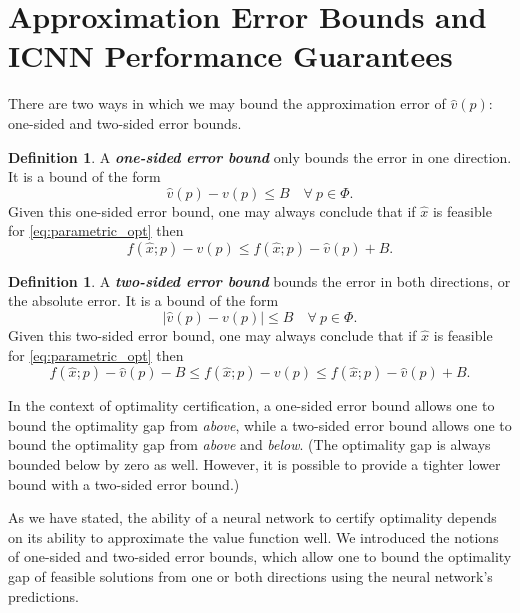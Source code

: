 \documentclass[10pt]{article} %
\theoremstyle{plain}
\theoremstyle{definition}
\newtheorem{definition}[theorem]{Definition}
\theoremstyle{remark}
\begin{document}
\section{Approximation Error Bounds and ICNN Performance Guarantees} \label{app:icnn-guarantees}

There are two ways in which we may bound the approximation error of $\hat{v}(p)$: one-sided and two-sided error bounds.

\begin{definition}
    A \textbf{\textit{one-sided error bound}} only bounds the error in one direction. It is a bound of the form
    \[
    \hat{v}(p) - v(p) \leq B \quad \forall~ p \in \Phi.
    \]
    Given this one-sided error bound, one may always conclude that if $\hat{x}$ is feasible for \eqref{eq:parametric_opt} then 
    \[
    f(\hat{x};p) - v(p) \leq f(\hat{x};p) - \hat{v}(p) + B.
    \]
\end{definition}

\begin{definition}
   A \textbf{\textit{two-sided error bound}} bounds the error in both directions, or the absolute error. It is a bound of the form
   \[
   |\hat{v}(p) - v(p)| \leq B \quad \forall~ p \in \Phi.
   \]
   Given this two-sided error bound, one may always conclude that if $\hat{x}$ is feasible for \eqref{eq:parametric_opt} then
   \[
   f(\hat{x};p) - \hat{v}(p) - B \leq f(\hat{x};p) - v(p) \leq f(\hat{x};p) - \hat{v}(p) + B.
   \]
\end{definition}

In the context of optimality certification, a one-sided error bound allows one to bound the optimality gap from \textit{above}, while a two-sided error bound allows one to bound the optimality gap from \textit{above} and \textit{below}. (The optimality gap is always bounded below by zero as well. However, it is possible to provide a tighter lower bound with a two-sided error bound.)

As we have stated, the ability of a neural network to certify optimality depends on its ability to approximate the value function well. We introduced the notions of one-sided and two-sided error bounds, which allow one to bound the optimality gap of feasible solutions from one or both directions using the neural network's predictions. 
\end{document}
